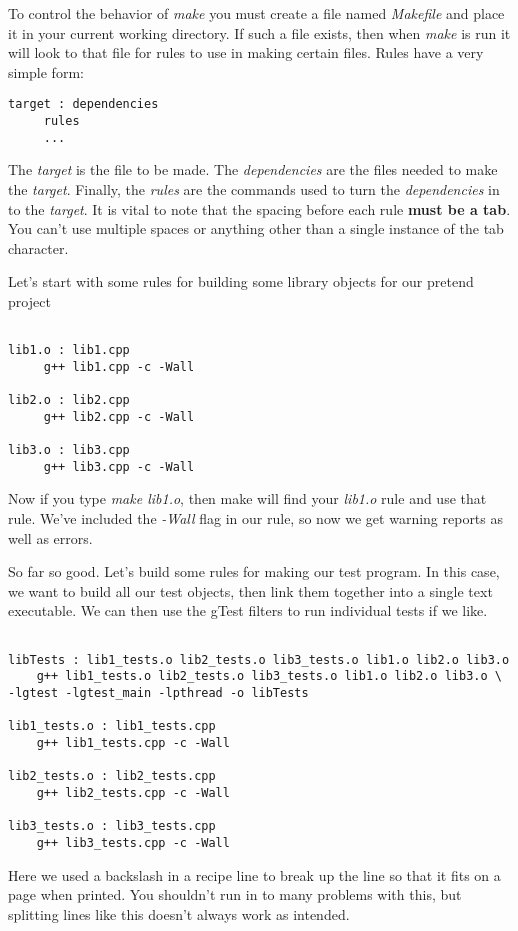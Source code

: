 \documentclass[]{tufte-handout}
\begin{document}
To control the behavior of \textit{make} you must create a file named \textit{Makefile} and place it in your current working directory. If such a file exists, then when \textit{make} is run it will look to that file for rules to use in making certain files.  Rules have a very simple form:
\begin{verbatim}
target : dependencies
     rules
     ...
\end{verbatim}
The \textit{target} is the file to be made. The \textit{dependencies} are the files needed to make the \textit{target}. Finally, the \textit{rules} are the commands used to turn the \textit{dependencies} in to the \textit{target}.  It is vital to note that the spacing before each rule \textbf{must be a tab}.  You can't use multiple spaces or anything other than a single instance of the tab character.

Let's start with some rules for building some library objects for our pretend project
\begin{verbatim}

lib1.o : lib1.cpp
     g++ lib1.cpp -c -Wall
     
lib2.o : lib2.cpp
     g++ lib2.cpp -c -Wall

lib3.o : lib3.cpp
     g++ lib3.cpp -c -Wall

\end{verbatim}
Now if you type \textit{make lib1.o}, then make will find your \textit{lib1.o} rule and use that rule. We've included the \textit{-Wall} flag in our rule, so now we get warning reports as well as errors.  

So far so good. Let's build some rules for making our test program.  In this case, we want to build all our test objects, then link them together into a single text executable. We can then use the gTest filters to run individual tests if we like. 
\begin{verbatim}

libTests : lib1_tests.o lib2_tests.o lib3_tests.o lib1.o lib2.o lib3.o
    g++ lib1_tests.o lib2_tests.o lib3_tests.o lib1.o lib2.o lib3.o \
-lgtest -lgtest_main -lpthread -o libTests

lib1_tests.o : lib1_tests.cpp
    g++ lib1_tests.cpp -c -Wall

lib2_tests.o : lib2_tests.cpp
    g++ lib2_tests.cpp -c -Wall

lib3_tests.o : lib3_tests.cpp
    g++ lib3_tests.cpp -c -Wall

\end{verbatim}
Here we used a backslash in a recipe line to break up the line so that it fits on a page when printed. You shouldn't run in to many problems with this, but splitting lines like this doesn't always work as intended.
\end{document}
